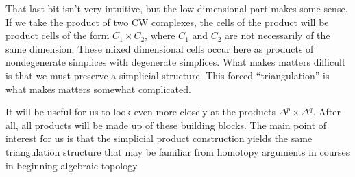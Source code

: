 \documentclass[12pt]{article}
\theoremstyle{plain}
\theoremstyle{definition}
\theoremstyle{remark}
\begin{document}
\smallskip

That last bit isn't very intuitive, but the low-dimensional part makes some sense. If we take the product of two CW complexes, the cells of the product will be product  cells of the form $C_1\times C_2$, where $C_1 $ and $C_2$ are not necessarily of the same dimension. These mixed dimensional cells occur here as products of nondegenerate simplices with degenerate simplices. What makes matters difficult is that we must preserve a simplicial structure. This forced ``triangulation'' is what makes matters somewhat complicated. 


It will be useful for us to look even more closely at the products $\Delta^p\times \Delta^q$. After all, all products will be made up of these building blocks. The main point of interest for us is that the simplicial product construction yields the same triangulation structure that may be familiar from homotopy arguments in courses in beginning algebraic topology. 
\end{document}
